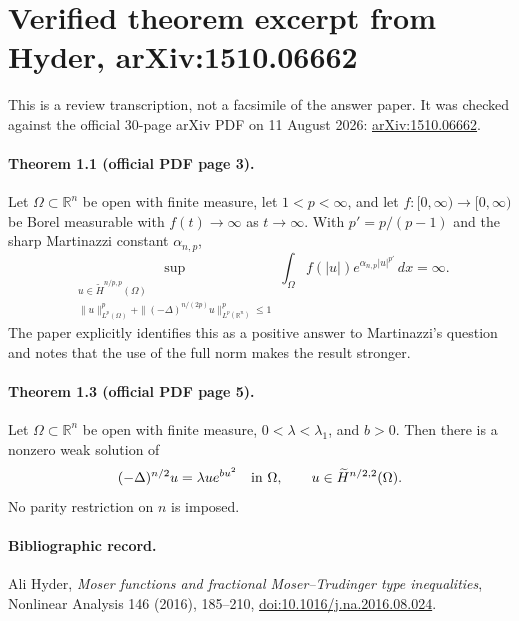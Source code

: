 \documentclass[11pt]{article}
\newcommand{\R}{\mathbb R}
\begin{document}
\section*{Verified theorem excerpt from Hyder, arXiv:1510.06662}

This is a review transcription, not a facsimile of the answer paper.  It was
checked against the official 30-page arXiv PDF on 11 August 2026:
\href{https://arxiv.org/pdf/1510.06662}{arXiv:1510.06662}.

\paragraph{Theorem 1.1 (official PDF page 3).}
Let $\Omega\subset\R^n$ be open with finite measure, let $1<p<\infty$, and let
$f:[0,\infty)\to[0,\infty)$ be Borel measurable with $f(t)\to\infty$ as
$t\to\infty$.  With $p'=p/(p-1)$ and the sharp Martinazzi constant
$\alpha_{n,p}$,
\[
 \sup_{\substack{u\in\widetilde H^{n/p,p}(\Omega)\\
 \|u\|_{L^p(\Omega)}^p+
 \|(-\Delta)^{n/(2p)}u\|_{L^p(\R^n)}^p\le1}}
 \int_\Omega f(|u|)e^{\alpha_{n,p}|u|^{p'}}\,dx=\infty.
\]
The paper explicitly identifies this as a positive answer to Martinazzi's
question and notes that the use of the full norm makes the result stronger.

\paragraph{Theorem 1.3 (official PDF page 5).}
Let $\Omega\subset\R^n$ be open with finite measure, $0<\lambda<\lambda_1$,
and $b>0$.  Then there is a nonzero weak solution of
\[
 (-\Delta)^{n/2}u=\lambda u e^{bu^2}\quad\hbox{in }\Omega,
 \qquad u\in\widetilde H^{n/2,2}(\Omega).
\]
No parity restriction on $n$ is imposed.

\paragraph{Bibliographic record.}
Ali Hyder, \emph{Moser functions and fractional Moser--Trudinger type
inequalities}, Nonlinear Analysis 146 (2016), 185--210,
\href{https://doi.org/10.1016/j.na.2016.08.024}{doi:10.1016/j.na.2016.08.024}.
\end{document}
